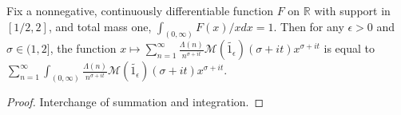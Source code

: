 \begin{lemma}
\label{SmoothedChebyshevDirichlet_aux_tsum_integral}
\leanok
Fix a nonnegative, continuously differentiable function $F$ on $\mathbb{R}$ with support in
  $[1/2,2]$, and total mass one, $\int_{(0,\infty)} F(x)/x dx = 1$. Then for any $\epsilon>0$ and
  $\sigma\in(1,2]$, the function
  $x \mapsto \sum_{n=1}^\infty \frac{\Lambda(n)}{n^{\sigma+it}}
  \mathcal{M}(\widetilde{1_{\epsilon}})(\sigma+it) x^{\sigma+it}$ is equal to
  $\sum_{n=1}^\infty \int_{(0,\infty)} \frac{\Lambda(n)}{n^{\sigma+it}}
  \mathcal{M}(\widetilde{1_{\epsilon}})(\sigma+it) x^{\sigma+it}$.
\end{lemma}
\begin{proof}
\leanok
Interchange of summation and integration.
\end{proof}
